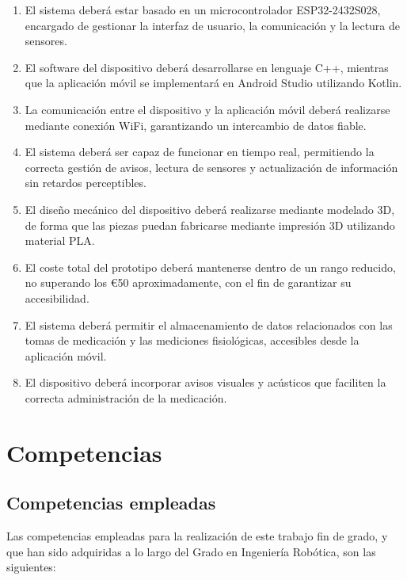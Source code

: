 \begin{enumerate}
\item El sistema deberá estar basado en un microcontrolador ESP32-2432S028, encargado de gestionar la interfaz de usuario, la comunicación y la lectura de sensores.

\item El software del dispositivo deberá desarrollarse en lenguaje C++, mientras que la aplicación móvil se implementará en Android Studio utilizando Kotlin.

\item La comunicación entre el dispositivo y la aplicación móvil deberá realizarse mediante conexión WiFi, garantizando un intercambio de datos fiable.

\item El sistema deberá ser capaz de funcionar en tiempo real, permitiendo la correcta gestión de avisos, lectura de sensores y actualización de información sin retardos perceptibles.

\item El diseño mecánico del dispositivo deberá realizarse mediante modelado 3D, de forma que las piezas puedan fabricarse mediante impresión 3D utilizando material PLA.

\item El coste total del prototipo deberá mantenerse dentro de un rango reducido, no superando los \euro {50} aproximadamente, con el fin de garantizar su accesibilidad.

\item El sistema deberá permitir el almacenamiento de datos relacionados con las tomas de medicación y las mediciones fisiológicas, accesibles desde la aplicación móvil.

\item El dispositivo deberá incorporar avisos visuales y acústicos que faciliten la correcta administración de la medicación.
\end{enumerate}

\section{Competencias}
\label{sec:competencias}

\subsection{Competencias empleadas}

Las competencias empleadas para la realización de este trabajo fin de grado, y que han sido adquiridas a lo largo del Grado en Ingeniería Robótica, son las siguientes:

